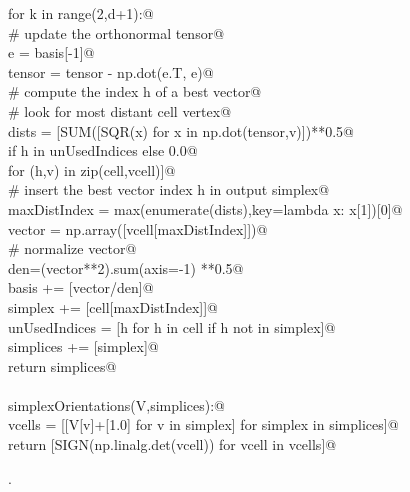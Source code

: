 \documentclass[11pt,oneside]{article}	%
\begin{document}
\begin{flushleft}
\begin{list}{}{}
\mbox{}\verb@      for k in range(2,d+1):@\\
\mbox{}\verb@         # update the orthonormal tensor@\\
\mbox{}\verb@         e = basis[-1]@\\
\mbox{}\verb@         tensor = tensor - np.dot(e.T, e)@\\
\mbox{}\verb@         # compute the index h of a best vector@\\
\mbox{}\verb@         # look for most distant cell vertex@\\
\mbox{}\verb@         dists = [SUM([SQR(x) for x in np.dot(tensor,v)])**0.5@\\
\mbox{}\verb@         if h in unUsedIndices else 0.0@\\
\mbox{}\verb@         for (h,v) in zip(cell,vcell)]@\\
\mbox{}\verb@         # insert the best vector index h in output simplex@\\
\mbox{}\verb@         maxDistIndex = max(enumerate(dists),key=lambda x: x[1])[0]@\\
\mbox{}\verb@         vector = np.array([vcell[maxDistIndex]])@\\
\mbox{}\verb@         # normalize vector@\\
\mbox{}\verb@         den=(vector**2).sum(axis=-1) **0.5@\\
\mbox{}\verb@         basis += [vector/den]@\\
\mbox{}\verb@         simplex += [cell[maxDistIndex]]@\\
\mbox{}\verb@         unUsedIndices = [h for h in cell if h not in simplex]@\\
\mbox{}\verb@      simplices += [simplex]@\\
\mbox{}\verb@   return simplices@\\
\mbox{}\verb@@\\
\mbox{}\verb@def simplexOrientations(V,simplices):@\\
\mbox{}\verb@   vcells = [[V[v]+[1.0] for v in simplex] for simplex in simplices]@\\
\mbox{}\verb@   return [SIGN(np.linalg.det(vcell)) for vcell in vcells]@\\
\mbox{}\verb@@{\NWsep}
\end{list}
\vspace{-1ex}
\footnotesize\addtolength{\baselineskip}{-1ex}
\begin{list}{}{\setlength{\itemsep}{-\parsep}\setlength{\itemindent}{-\leftmargin}}
\item {\NWtxtMacroNoRef}.
\end{list}
\end{flushleft}
\end{document}
